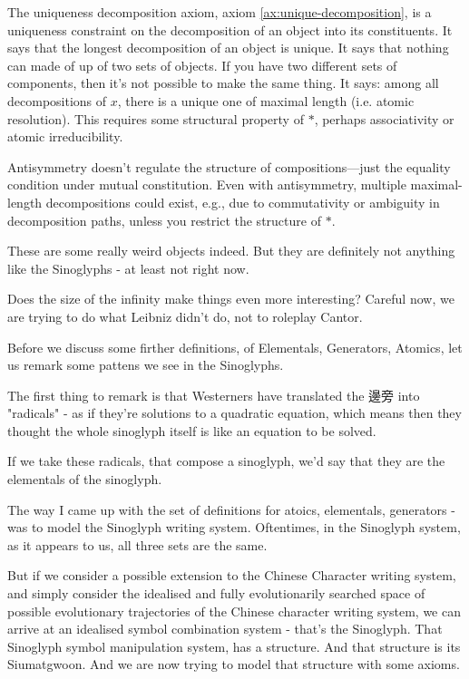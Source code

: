 The uniqueness decomposition axiom, axiom \ref{ax:unique-decomposition}, is a uniqueness constraint on the decomposition of an object into its constituents. It says that the longest decomposition of an object is unique. It says that nothing can made of up of two sets of objects. If you have two different sets of components, then it's not possible to make the same thing. It says: among all decompositions of $x$, there is a unique one of maximal length (i.e. atomic resolution). This requires some structural property of $*$, perhaps associativity or atomic irreducibility. 

Antisymmetry doesn't regulate the structure of compositions—just the equality condition under mutual constitution. Even with antisymmetry, multiple maximal-length decompositions could exist, e.g., due to commutativity or ambiguity in decomposition paths, unless you restrict the structure of $*$.



These are some really weird objects indeed. But they are definitely not anything like the Sinoglyphs - at least not right now. 




Does the size of the infinity make things even more interesting? Careful now, we are trying to do what Leibniz didn't do, not to roleplay Cantor. 

Before we discuss some firther definitions, of Elementals, Generators, Atomics, let us remark some pattens we see in the Sinoglyphs. 

The first thing to remark is that Westerners have translated the 邊旁 into "radicals" - as if they're solutions to a quadratic equation, which means then they thought the whole sinoglyph itself is like an equation to be solved. 

If we take these radicals, that compose a sinoglyph, we'd say that they are the elementals of the sinoglyph. 

The way I came up with the set of definitions for atoics, elementals, generators - was to model the Sinoglyph writing system. Oftentimes, in the Sinoglyph system, as it appears to us, all three sets are the same. 

But if we consider a possible extension to the Chinese Character writing system, and simply consider the idealised and fully evolutionarily searched space of possible evolutionary trajectories of the Chinese character writing system, we can arrive at an idealised symbol combination system - that's the Sinoglyph. That Sinoglyph symbol manipulation system, has a structure. And that structure is its Siumatgwoon. And we are now trying to model that structure with some axioms. 

